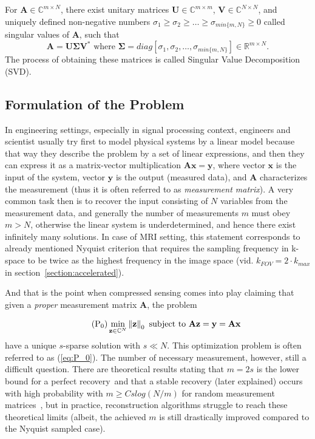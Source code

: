 \begin{tight_equations}
\begin{theorem}[SVD]
For $\mathbf{A} \in \mathbb{C}^{m \times N}$, there exist unitary matrices $\mathbf{U} \in \mathbb{C}^{m \times m}$, $\mathbf{V} \in \mathbb{C}^{N \times N}$, and uniquely defined non-negative numbers $\sigma_1 \ge \sigma_2 \ge \ldots \ge \sigma_{min\{m,N\}} \ge 0$ called singular values of $\mathbf{A}$, such that 
\[\mathbf{A} = \mathbf{U \Sigma V^*} \text{ where } \mathbf{\Sigma} = diag[\sigma_1, \sigma_2, \ldots, \sigma_{min\{m,N\}}] \in \mathbb{R}^{m \times N}.\]
The process of obtaining these matrices is called Singular Value Decomposition (SVD).
\end{theorem}

\end{tight_equations}

\subsection{Formulation of the Problem}
In engineering settings, especially in signal processing context, engineers and scientist usually try first to model physical systems by a linear model because that way they describe the problem by a set of linear expressions, and then they can express it as a matrix-vector multiplication $\mathbf{Ax} = \mathbf{y}$, where vector $\mathbf{x}$ is the input of the system, vector $\mathbf{y}$ is the output (measured data), and $\mathbf{A}$ characterizes the measurement (thus it is often referred to as \textit{measurement matrix}). A very common task then is to recover the input consisting of $N$ variables from the measurement data, and generally the number of measurements $m$ must obey $m > N$, otherwise the linear system is underdetermined, and hence there exist infinitely many solutions. In case of MRI setting, this statement corresponds to already mentioned Nyquist criterion that requires the sampling frequency in k-space to be twice as the highest frequency in the image space (vid. $k_{FOV} = 2 \cdot k_{max}$ in section~\ref{section:accelerated}).

And that is the point when compressed sensing comes into play claiming that given a \textit{proper} measurement matrix $\mathbf{A}$, the problem

\begin{equation}
    \tag{P\textsubscript{0}}\label{eq:P_0}
    \min_{\mathbf{z} \in \mathbb{C}^N} \norm{\mathbf{z}}_0 \text{ subject to } \mathbf{Az} = \mathbf{y} = \mathbf{Ax}
\end{equation}
have a unique $s$-sparse solution with $s \ll N$. This optimization problem is often referred to as (\ref{eq:P_0}). The number of necessary measurement, however, still a difficult question. There are theoretical results stating that $m = 2s$ is the lower bound for a perfect recovery~\citationneeded and that a stable recovery (later explained) occurs with high probability with $m \ge C s log(N / m)$ for random measurement matrices~\citationneeded, but in practice, reconstruction algorithms struggle to reach these theoretical limits (albeit, the achieved $m$ is still drastically improved compared to the Nyquist sampled case).

